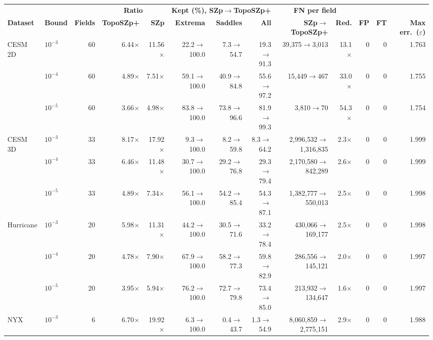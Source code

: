 \begin{tabular}{@{}llrrrrrrrrrrr@{}}
\toprule
 & & & \multicolumn{2}{c}{\textbf{Ratio}} & \multicolumn{3}{c}{\textbf{Kept (\%), SZp$\to$TopoSZp+}} & \multicolumn{2}{c}{\textbf{FN per field}} & & & \\
\cmidrule(lr){4-5}\cmidrule(lr){6-8}\cmidrule(lr){9-10}
\textbf{Dataset} & \textbf{Bound} & \textbf{Fields} & \textbf{TopoSZp+} & \textbf{SZp} & \textbf{Extrema} & \textbf{Saddles} & \textbf{All} & \textbf{SZp$\to$TopoSZp+} & \textbf{Red.} & \textbf{FP} & \textbf{FT} & \textbf{Max err.\ ($\varepsilon$)} \\
\midrule
CESM 2D & $10^{-3}$ & 60 & 6.44$\times$ & 11.56$\times$ & 22.2$\to$100.0 & 7.3$\to$54.7 & 19.3$\to$91.3 & 39{,}375$\to$3{,}013 & 13.1$\times$ & 0 & 0 & 1.763 \\
 & $10^{-4}$ & 60 & 4.89$\times$ & 7.51$\times$ & 59.1$\to$100.0 & 40.9$\to$84.8 & 55.6$\to$97.2 & 15{,}449$\to$467 & 33.0$\times$ & 0 & 0 & 1.755 \\
 & $10^{-5}$ & 60 & 3.66$\times$ & 4.98$\times$ & 83.8$\to$100.0 & 73.8$\to$96.6 & 81.9$\to$99.3 & 3{,}810$\to$70 & 54.3$\times$ & 0 & 0 & 1.754 \\
\midrule
CESM 3D & $10^{-3}$ & 33 & 8.17$\times$ & 17.92$\times$ & 9.3$\to$100.0 & 8.2$\to$59.8 & 8.3$\to$64.2 & 2{,}996{,}532$\to$1{,}316{,}835 & 2.3$\times$ & 0 & 0 & 1.999 \\
 & $10^{-4}$ & 33 & 6.46$\times$ & 11.48$\times$ & 30.7$\to$100.0 & 29.2$\to$76.8 & 29.3$\to$79.4 & 2{,}170{,}580$\to$842{,}289 & 2.6$\times$ & 0 & 0 & 1.999 \\
 & $10^{-5}$ & 33 & 4.89$\times$ & 7.34$\times$ & 56.1$\to$100.0 & 54.2$\to$85.4 & 54.3$\to$87.1 & 1{,}382{,}777$\to$550{,}013 & 2.5$\times$ & 0 & 0 & 1.998 \\
\midrule
Hurricane & $10^{-3}$ & 20 & 5.98$\times$ & 11.31$\times$ & 44.2$\to$100.0 & 30.5$\to$71.6 & 33.2$\to$78.4 & 430{,}066$\to$169{,}177 & 2.5$\times$ & 0 & 0 & 1.998 \\
 & $10^{-4}$ & 20 & 4.78$\times$ & 7.90$\times$ & 67.9$\to$100.0 & 58.2$\to$77.3 & 59.8$\to$82.9 & 286{,}556$\to$145{,}121 & 2.0$\times$ & 0 & 0 & 1.997 \\
 & $10^{-5}$ & 20 & 3.95$\times$ & 5.94$\times$ & 76.2$\to$100.0 & 72.7$\to$79.8 & 73.4$\to$85.0 & 213{,}932$\to$134{,}647 & 1.6$\times$ & 0 & 0 & 1.997 \\
\midrule
NYX & $10^{-3}$ & 6 & 6.70$\times$ & 19.92$\times$ & 6.3$\to$100.0 & 0.4$\to$43.7 & 1.3$\to$54.9 & 8{,}060{,}859$\to$2{,}775{,}151 & 2.9$\times$ & 0 & 0 & 1.988 \\

\end{tabular}
